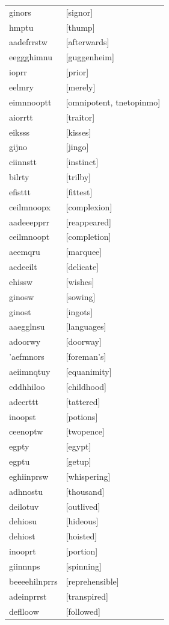 \documentclass{article}
\begin{document}
\begin{tabular}{ll}
ginors & [signor] \\
hmptu & [thump] \\
aadefrrstw & [afterwards] \\
eeggghimnu & [guggenheim] \\
ioprr & [prior] \\
eelmry & [merely] \\
eimnnooptt & [omnipotent, tnetopinmo] \\
aiorrtt & [traitor] \\
eiksss & [kisses] \\
gijno & [jingo] \\
ciinnstt & [instinct] \\
bilrty & [trilby] \\
efisttt & [fittest] \\
ceilmnoopx & [complexion] \\
aadeeepprr & [reappeared] \\
ceilmnoopt & [completion] \\
aeemqru & [marquee] \\
acdeeilt & [delicate] \\
ehissw & [wishes] \\
ginosw & [sowing] \\
ginost & [ingots] \\
aaegglnsu & [languages] \\
adoorwy & [doorway] \\
'aefmnors & [foreman's] \\
aeiimnqtuy & [equanimity] \\
cddhhiloo & [childhood] \\
adeerttt & [tattered] \\
inoopst & [potions] \\
ceenoptw & [twopence] \\
egpty & [egypt] \\
egptu & [getup] \\
eghiinprsw & [whispering] \\
adhnostu & [thousand] \\
deilotuv & [outlived] \\
dehiosu & [hideous] \\
dehiost & [hoisted] \\
inooprt & [portion] \\
giinnnps & [spinning] \\
beeeehilnprrs & [reprehensible] \\
adeinprrst & [transpired] \\
deflloow & [followed] \\

\end{tabular}
\end{document}
